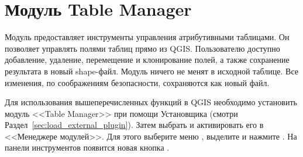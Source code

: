 
\section{Модуль Table Manager}\label{sec:ftools}


Модуль предоставляет инструменты управления атрибутивными таблицами. Он
позволяет управлять полями таблиц прямо из QGIS. Пользователю доступно
добавление, удаление, перемещение и клонирование полей, а также сохранение
результата в новый shape-файл. Модуль ничего не менят в исходной таблице.
Все изменения, по соображениям безопасности, сохраняются как новый файл.


Для использования вышеперечисленных функций в QGIS необходимо установить модуль
<<Table Manager>> при помощи  Установщика
(смотри Раздел~\ref{sec:load_external_plugin}). Затем выбрать и
активировать его в <<Менеджере модулей>>. Для этого выберите меню
 \arrow {}, выделите
 и нажмите . На панели
инструментов появится новая кнопка .
